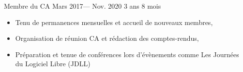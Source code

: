 \volunteerposition%
{Membre du CA}%
{Mars 2017--- Nov. 2020}%
{3 ans 8 mois}%
{
	\begin{itemize}
		\item Tenu de permanences mensuelles et accueil de nouveaux membres,
		\item Organisation de réunion CA et rédaction des comptes-rendus,
		\item Préparation et tenue de conférences lors d’évènements comme Les Journées du Logiciel Libre (JDLL)
	\end{itemize}
}
